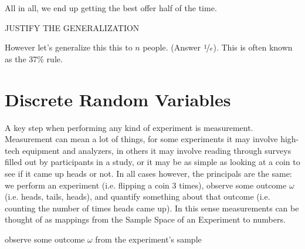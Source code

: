 \documentclass{report}
\begin{document}
\\\\

All in all, we end up getting the best offer half of the time.

\todo JUSTIFY THE GENERALIZATION

However let's generalize this this to $n$ people. (Answer $\nicefrac 1e$). This is often known as the 37\% rule. 


\section{Discrete Random Variables}
A key step when performing any kind of experiment is measurement. Measurement can mean a lot of things, for some experiments it may involve high-tech equipment and analyzers, in others it may involve reading through surveys filled out by participants in a study, or it may be as simple as looking at a coin to see if it came up heads or not. In all cases however, the principals are the same: we perform an experiment (i.e. flipping a coin 3 times), observe some outcome $\omega$ (i.e. heads, tails, heads), and quantify something about that outcome (i.e. counting the number of times heads came up). In this sense measurements can be thought of as mappings from the Sample Space of an Experiment to numbers.


\newpage


observe some outcome $\omega$ from the experiment's sample 
\end{document}
